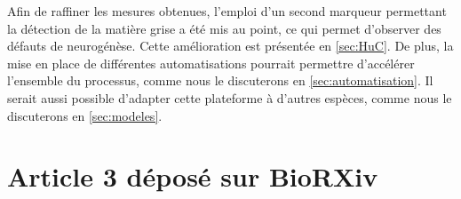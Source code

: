 \documentclass[\main/main.tex]{subfiles}
\begin{document}
Afin de raffiner les mesures obtenues, l'emploi d'un second marqueur permettant la détection de la matière grise a été mis au point, ce qui permet d'observer des défauts de neurogénèse. Cette amélioration est présentée en \autoref{sec:HuC}.
%
De plus, la mise en place de différentes automatisations pourrait permettre d'accélérer l'ensemble du processus, comme nous le discuterons en \autoref{sec:automatisation}.
%
Il serait aussi possible d'adapter cette plateforme à d'autres espèces, comme nous le discuterons en \autoref{sec:modeles}.

\section{Article 3 déposé sur BioRXiv}
\end{document}
